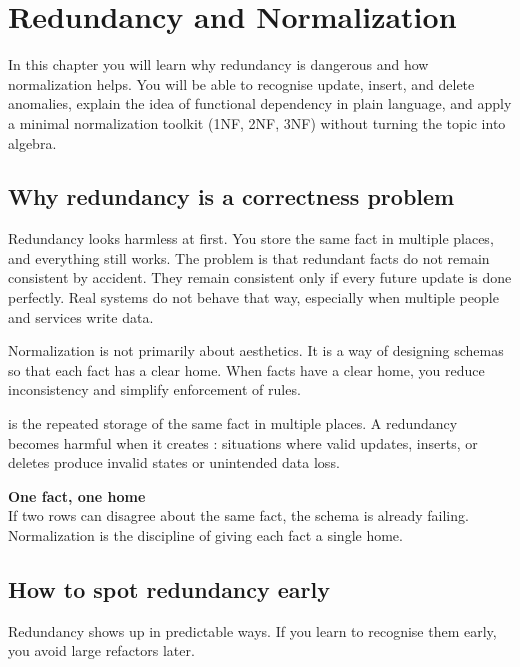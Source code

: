 \chapter{Redundancy and Normalization}

\begin{learningobjectives}
In this chapter you will learn why redundancy is dangerous and how normalization helps.
You will be able to recognise update, insert, and delete anomalies, explain the idea of functional dependency in plain language, and apply a minimal normalization toolkit (1NF, 2NF, 3NF) without turning the topic into algebra.
\end{learningobjectives}

\section{Why redundancy is a correctness problem}
Redundancy looks harmless at first.
You store the same fact in multiple places, and everything still works.
The problem is that redundant facts do not remain consistent by accident.
They remain consistent only if every future update is done perfectly.
Real systems do not behave that way, especially when multiple people and services write data.

Normalization is not primarily about aesthetics.
It is a way of designing schemas so that each fact has a clear home.
When facts have a clear home, you reduce inconsistency and simplify enforcement of rules.

\begin{definitionbox}
 is the repeated storage of the same fact in multiple places.
A redundancy becomes harmful when it creates : situations where valid updates, inserts, or deletes produce invalid states or unintended data loss.
\end{definitionbox}

\begin{principlebox}
\textbf{One fact, one home}\\
If two rows can disagree about the same fact, the schema is already failing.
Normalization is the discipline of giving each fact a single home.
\end{principlebox}

\section{How to spot redundancy early}
Redundancy shows up in predictable ways.
If you learn to recognise them early, you avoid large refactors later.

